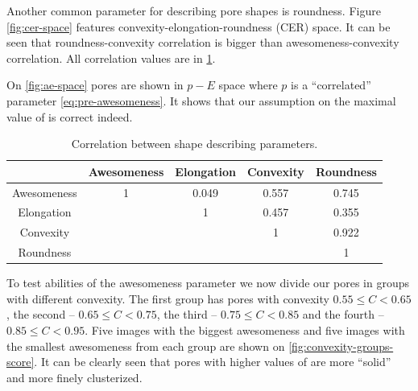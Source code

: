 \documentclass[reprint,amsmath,amssymb,aps,pre,showkeys,showpacs]{revtex4-1}
\newcommand{\highlight}[1]{{\color{red}{#1}}} %
\begin{document}
Another common parameter for describing pore shapes is roundness. Figure
\ref{fig:cer-space} features convexity-elongation-roundness (CER) space.
It can be seen that roundness-convexity correlation is bigger than
awesomeness-convexity correlation. All correlation values are in
\cref{tab:correlations}.

On \cref{fig:ae-space} pores are shown in $p-E$ space where $p$ is a
``correlated'' \highlight{awesomeness} parameter \cref{eq:pre-awesomeness}. It
shows that our assumption on the maximal value of \highlight{awesomeness} is
correct indeed.

\begin{table}[!htp]
  \centering
  \begin{tabular}{|c|c|c|c|c|}
    \hline
    & Awesomeness & Elongation & Convexity & Roundness \\
    \hline
    Awesomeness & 1 & 0.049 & 0.557 & 0.745 \\
    \hline
    Elongation & & 1 & 0.457 & 0.355 \\
    \hline
    Convexity &&& 1 & 0.922 \\
    \hline
    Roundness &&&& 1 \\
    \hline
  \end{tabular}
  \caption{Correlation between shape describing parameters.}
  \label{tab:correlations}
\end{table}

To test abilities of the awesomeness parameter we now divide our pores in groups
with different convexity. The first group has pores with convexity $0.55 \le C < 0.65$,
the second -- $0.65 \le C < 0.75$, the third -- $0.75 \le C < 0.85$ and the fourth
-- $0.85 \le C < 0.95$. Five images with the biggest awesomeness and five images
with the smallest awesomeness from each group are shown on
\cref{fig:convexity-groups-score}. It can be clearly seen that pores with higher
values of \highlight{awesomeness} are more ``solid'' and more finely
clusterized.
\end{document}
